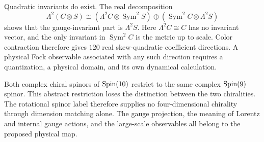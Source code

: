 Quadratic invariants do exist. The real decomposition
\[
 \Lambda^2(C\otimes S)
  \cong(\Lambda^2 C\otimes\operatorname{Sym}^2S)
      \oplus(\operatorname{Sym}^2C\otimes\Lambda^2S)
\]
shows that the gauge-invariant part is $\Lambda^2 S$. Here $\Lambda^2 C\cong C$ has no invariant vector, and the only invariant in $\operatorname{Sym}^2 C$ is the metric up to scale. Color contraction therefore gives $120$ real skew-quadratic coefficient directions. A physical Fock observable associated with any such direction requires a quantization, a physical domain, and its own dynamical calculation.

Both complex chiral spinors of $\operatorname{Spin}(10)$ restrict to the same complex $\operatorname{Spin}(9)$ spinor. This abstract restriction loses the distinction between the two chiralities. The rotational spinor label therefore supplies no four-dimensional chirality through dimension matching alone. The gauge projection, the meaning of Lorentz and internal gauge actions, and the large-scale observables all belong to the proposed physical map.
